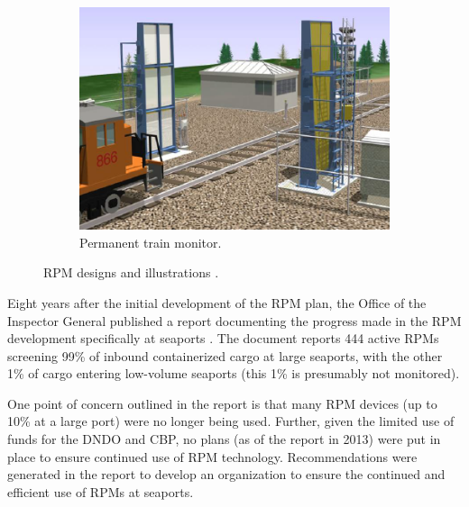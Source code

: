 \documentclass{report}
\begin{document}
\begin{figure}
\begin{subfigure}[b]{0.3\textwidth}
        \end{subfigure}
        ~ %
        \begin{subfigure}[b]{0.3\textwidth}
                \includegraphics[width=\textwidth,scale=1]{./figures/perm_train.png}
                \caption{Permanent train monitor.}
                \label{fig:perm_train}
        \end{subfigure}
        \caption{RPM designs and illustrations \cite{Simmons2005}.}\label{fig:RPM_designs}
\end{figure}
  


Eight years after the initial development of the RPM plan, the Office of the Inspector General published a report documenting the progress made in the RPM development specifically at seaports \cite{DepartmentofHomelandSecurityDHS2013}. The document reports 444 active RPMs screening 99\% of inbound containerized cargo at large seaports, with the other 1\% of cargo entering low-volume seaports (this 1\% is presumably not monitored). 


One point of concern outlined in the report is that many RPM devices (up to 10\% at a large port) were no longer being used. Further, given the limited use of funds for the DNDO and CBP, no plans (as of the report in 2013) were put in place to ensure continued use of RPM technology. Recommendations were generated in the report to develop an organization to ensure the continued and efficient use of RPMs at seaports. 
\end{document}
